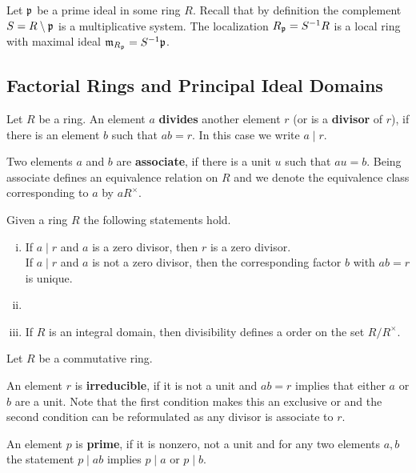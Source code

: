 	\begin{corollary}
		Let $\mathfrak{p}$ be a prime ideal in some ring $R$. Recall that by definition the complement $S = R\setminus \mathfrak{p}$ is a multiplicative system. The localization $R_{\mathfrak{p}} = S^{-1}R$ is a local ring with maximal ideal $\mathfrak{m}_{R_{\mathfrak{p}}} = S^{-1}\mathfrak{p}$.
	\end{corollary}

	\newpage
	\subsection{Factorial Rings and Principal Ideal Domains}

	\begin{definition}
		Let $R$ be a ring. An element $a$ \textbf{divides} another element $r$ (or is a \textbf{divisor} of $r$), if there is an element $b$ such that $ab = r$. In this case we write $a \mid r$.

		Two elements $a$ and $b$ are \textbf{associate}, if there is a unit $u$ such that $au = b$. Being associate defines an equivalence relation on $R$ and we denote the equivalence class corresponding to $a$ by $aR^\times$. 
	\end{definition}

	\begin{lemma}
		Given a ring $R$ the following statements hold.
		\begin{enumerate}[(i)]
			\item{
				If $a \mid r$ and $a$ is a zero divisor, then $r$ is a zero divisor.\\
				If $a \mid r$ and $a$ is not a zero divisor, then the corresponding factor $b$ with $ab = r$ is unique.
			}
			\item{
			}
			\item{
				If $R$ is an integral domain, then divisibility defines a  order on the set $R/R^\times$.
			}
		\end{enumerate}
	\end{lemma}

	\begin{definition}
		Let $R$ be a commutative ring.

		An element $r$ is \textbf{irreducible}, if it is not a unit and $ab = r$ implies that either $a$ or $b$ are a unit. Note that the first condition makes this an exclusive or and the second condition can be reformulated as any divisor is associate to $r$.

		An element $p$ is \textbf{prime}, if it is nonzero, not a unit and for any two elements $a,b$ the statement $p \mid ab$ implies $p \mid a$ or $p \mid b$.
	\end{definition}

